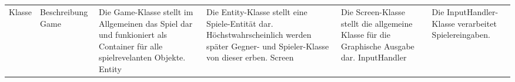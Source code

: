\\\\

\begin{tabularx}{\textwidth}{| p{0.7cm} | p{1.5cm} | X |}
\hline
{} Klasse & Beschreibung
\hline
Game & Die Game-Klasse stellt im Allgemeinen das Spiel dar und funkioniert als Container für alle spielrevelanten Objekte.
\hline
Entity & Die Entity-Klasse stellt eine Spiele-Entität dar. Höchstwahrscheinlich werden später Gegner- und Spieler-Klasse von dieser erben.
\hline
Screen & Die Screen-Klasse stellt die allgemeine Klasse für die Graphische Ausgabe dar.
\hline
InputHandler & Die InputHandler-Klasse verarbeitet Spielereingaben.
\hline
\end{tabularx}